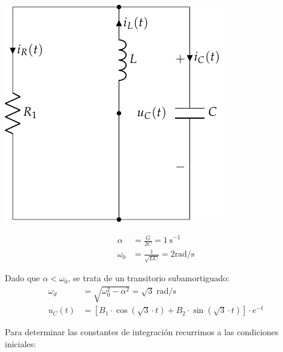 \vspace{3mm}
\begin{minipage}{0.3\textwidth}
  \includegraphics[scale=0.9]{figuras/FM_4_9_natural}
\end{minipage}
\begin{minipage}{0.7\textwidth}
  \begin{align*}
    \alpha &= \frac{G}{2C} = \SI{1}{\second}^{-1}\\
    \omega_0 &= \frac{1}{\sqrt{LC}} = 2\si{\radian\per\second}
  \end{align*}
\end{minipage}

\bigskip

Dado que $\alpha < \omega_0$, se trata de un transitorio
subamortiguado:
\begin{align*}
  \omega_d &= \sqrt{\omega_0^2 - \alpha^2} = \sqrt{3}\;\si{\radian\per\second}\\
  u_C(t) &= [B_1 \cdot \cos(\sqrt{3} \cdot t) + B_2 \cdot \sin(\sqrt{3} \cdot t)] \cdot e^{-t}
\end{align*}

\vspace{2mm}
Para determinar las constantes de integración recurrimos a las
condiciones iniciales:

